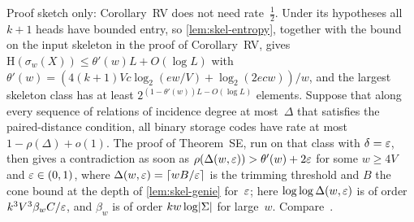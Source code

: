 \begin{remark}\label{rem:skel-weak-crux}
Proof sketch only: Corollary~RV does not need rate~$\frac12$. Under its hypotheses all $k+1$ heads have bounded entry,
so \cref{lem:skel-entropy}, together with the bound on the input skeleton in the proof of Corollary~RV, gives
$\mathrm H(\sigma_w(X))\le\theta'(w)L+O(\log L)$ with $\theta'(w)=(4(k+1)Vc\log_2(ew/V)+\log_2(2ecw))/w$, and the
largest skeleton class has at least $2^{(1-\theta'(w))L-O(\log L)}$ elements. Suppose that along every sequence of
relations of incidence degree at most~$\Delta$ that satisfies the paired-distance condition, all binary storage codes
have rate at most $1-\rho(\Delta)+o(1)$. The proof of Theorem~SE, run on that class with $\delta=\varepsilon$, then gives a
contradiction as soon as $\rho(\Delta(w,\varepsilon))>\theta'(w)+2\varepsilon$ for some $w\ge4V$ and $\varepsilon\in(0,1)$, where
$\Delta(w,\varepsilon)=\lceil wB/\varepsilon\rceil$ is the trimming threshold and $B$ the cone bound at the depth of
\cref{lem:skel-genie} for~$\varepsilon$; here $\log\log\Delta(w,\varepsilon)$ is of order $k^3V^3\beta_wC/\varepsilon$, and $\beta_w$ is of
order $kw\log\lvert \Sigma \rvert$ for large~$w$. Compare~\cite[Remark~6.5]{BoundedNesting2026}.
\end{remark}
